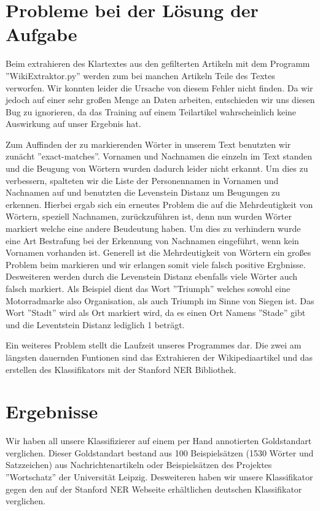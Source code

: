 \documentclass[a4paper]{article}
\begin{document}
\section{Probleme bei der Lösung der Aufgabe}
	Beim extrahieren des Klartextes aus den gefilterten Artikeln mit dem Programm ''WikiExtraktor.py'' werden zum bei manchen Artikeln Teile des Textes verworfen. 
	Wir konnten leider die Ursache von diesem Fehler nicht finden. 
	Da wir jedoch auf einer sehr großen Menge an Daten arbeiten, entschieden wir uns diesen Bug zu ignorieren, da das Training auf einem Teilartikel wahrscheinlich keine Auswirkung auf unser Ergebnis hat.
	
	Zum Auffinden der zu markierenden Wörter in unserem Text benutzten wir zunächt ''exact-matches''. Vornamen und Nachnamen die einzeln im Text standen und die Beugung von Wörtern wurden dadurch leider nicht erkannt. 
	Um dies zu verbessern, spalteten wir die Liste der Personennamen in Vornamen und Nachnamen auf und benutzten die Levenstein Distanz um Beugungen zu erkennen. 
	Hierbei ergab sich ein erneutes Problem die auf die Mehrdeutigkeit von Wörtern, speziell Nachnamen, zurückzuführen ist, denn nun wurden Wörter markiert welche eine andere Beudeutung haben. 
	Um dies zu verhindern wurde eine Art Bestrafung bei der Erkennung von Nachnamen eingeführt, wenn kein Vornamen vorhanden ist. 
	Generell ist die Mehrdeutigkeit von Wörtern ein großes Problem beim markieren und wir erlangen somit viele falsch positive Ergbnisse. 
	Desweiteren werden durch die Levenstein Distanz ebenfalls viele Wörter auch falsch markiert. 
	Als Beispiel dient das Wort ''Triumph'' welches sowohl eine Motorradmarke also Organisation, als auch Triumph im Sinne von Siegen ist. Das Wort ''Stadt'' wird als Ort markiert wird, da es einen Ort Namens ''Stade'' gibt und die Leventstein Distanz lediglich 1 beträgt.
	
	Ein weiteres Problem stellt die Laufzeit unseres Programmes dar. 
	Die zwei am längsten dauernden Funtionen sind das Extrahieren der Wikipediaartikel und das erstellen des Klassifikators mit der Stanford NER Bibliothek.
\section{Ergebnisse}
	Wir haben all unsere Klassifizierer auf einem per Hand annotierten Goldstandart verglichen. 
	Dieser Goldstandart bestand aus 100 Beispielsätzen (1530 Wörter und Satzzeichen) aus Nachrichtenartikeln oder Beispielsätzen des Projektes ''Wortschatz'' der Universität Leipzig. Desweiteren haben wir unsere Klassifikator gegen den auf der Stanford NER Webseite erhältlichen deutschen Klassifikator  verglichen.
\end{document}
